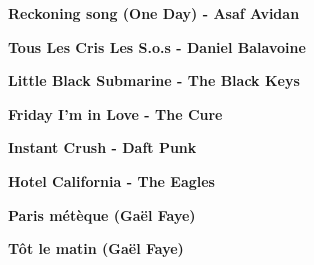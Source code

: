 \documentclass{guitartabs}
\begin{document}
\linespread{0.3}
\tableofcontents
\newpage

\linespread{1}



\begin{guitar}
\textbf{Reckoning song (One Day) - Asaf Avidan}

\end{guitar}



\begin{guitar}
\textbf{Tous Les Cris Les S.o.s - Daniel Balavoine}

\end{guitar}



\begin{guitar}
\textbf{Little Black Submarine - The Black Keys}

\end{guitar}



\begin{guitar}
\textbf{Friday I'm in Love - The Cure}

\end{guitar}





\begin{guitar}
\textbf{Instant Crush - Daft Punk}

\end{guitar}




\begin{guitar}
\textbf{Hotel California - The Eagles}

\end{guitar}



\begin{guitar}
\textbf{Paris métèque (Gaël Faye)}

\end{guitar}

\begin{guitar}
\textbf{Tôt le matin (Gaël Faye)}

\end{guitar}
\end{document}
